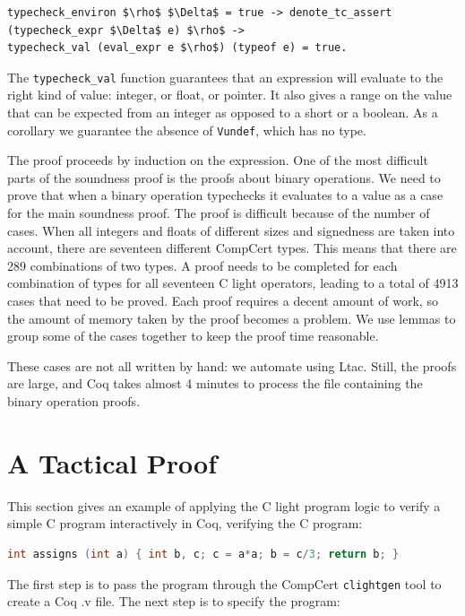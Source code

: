 \documentclass{puthesis}
\begin{document}
\begin{lstlisting}
typecheck_environ $\rho$ $\Delta$ = true -> denote_tc_assert (typecheck_expr $\Delta$ e) $\rho$ ->
typecheck_val (eval_expr e $\rho$) (typeof e) = true.
\end{lstlisting} 

The \lstinline|typecheck_val| function guarantees that an expression
will evaluate to the right kind of value: integer, or float, or
pointer. It also gives a range on the value that can be expected from
an integer as opposed to a short or a boolean.  As a corollary we
guarantee the absence of \lstinline|Vundef|, which has no type.

The proof proceeds by induction on the expression.  One of the most
difficult parts of the soundness proof is the proofs about binary
operations. We need to prove that when a binary operation typechecks
it evaluates to a value as a case for the main soundness proof. The
proof is difficult because of the number of cases. When all integers
and floats of different sizes and signedness are taken into account,
there are seventeen different CompCert types. This means that there
are 289 combinations of two types. A proof needs to be completed for
each combination of types for all seventeen C light operators, leading
to a total of 4913 cases that need to be proved.  Each proof requires
a decent amount of work, so the amount of memory taken by the proof
becomes a problem. We use lemmas to group some of the cases together
to keep the proof time reasonable.

These cases are not all written by hand: we automate using Ltac.
Still, the proofs are large, and Coq takes almost 4 minutes to process
the file containing the binary operation proofs.


\section{A Tactical Proof}
\label{sec:example}
This section gives an example of applying the C light program logic to
verify a simple C program interactively in Coq, verifying the C
program:

\begin{lstlisting}[language=c]
int assigns (int a) { int b, c; c = a*a; b = c/3; return b; }
\end{lstlisting}

The first step is to pass the program through the CompCert
\lstinline|clightgen| tool to create a Coq .v file. The next step is
to specify the program:
\end{document}
